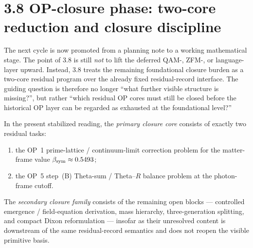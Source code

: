 \section*{3.8 OP-closure phase: two-core reduction and closure discipline}
The next cycle is now promoted from a planning note to a working mathematical stage. The point of 3.8 is still \emph{not} to lift the deferred QAM-, ZFM-, or language-layer upward. Instead, 3.8 treats the remaining foundational closure burden as a two-core residual program over the already fixed residual-record interface. The guiding question is therefore no longer ``what further visible structure is missing?'', but rather ``which residual OP cores must still be closed before the historical OP layer can be regarded as exhausted at the foundational level?''

\begin{definition}
\label{def:mainline-3800}
In the present stabilized reading, the \emph{primary closure core} consists of exactly two residual tasks:
\begin{enumerate}[label=(\roman*), leftmargin=2em]
  \item the OP~1 prime-lattice / continuum-limit correction problem for the matter-frame value $\beta_{\mathrm{sym}}\approx 0.5493$;
  \item the OP~5 step~(B) Theta-sum / Theta--$R$ balance problem at the photon-frame cutoff.
\end{enumerate}
The \emph{secondary closure family} consists of the remaining open blocks --- controlled emergence / field-equation derivation, mass hierarchy, three-generation splitting, and compact Dixon reformulation --- insofar as their unresolved content is downstream of the same residual-record semantics and does not reopen the visible primitive basis.
\end{definition}


